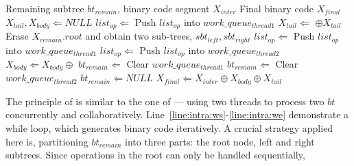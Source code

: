 \documentclass[12pt]{article}
\begin{document}
\begin{CJK}{UTF8}{bkai}
\begin{algorithm}[h]
    \caption{}
    \begin{algorithmic}[1]
        \Require    Remaining subtree $bt_{remain}$, binary code segment $X_{inter}$
        \Ensure     Final binary code $X_{final}$
        \State $X_{tail}, X_{body} \Leftarrow NULL$
            \label{line:intra:ws}
            \State $list_{op} \Leftarrow$ 
            \State Push $list_{op}$ into $work\_queue_{thread1}$
            \State $X_{tail} \Leftarrow$  $\oplus X_{tail}$
            \State Erase $X_{remain}.root$ and obtain two sub-trees, $sbt_{left}, sbt_{right}$
            \Statex
            \State $list_{op} \Leftarrow$ 
            \State Push $list_{op}$ into $work\_queue_{thread1}$
            \State $list_{op} \Leftarrow$ 
            \State Push $list_{op}$ into $work\_queue_{thread2}$
            \State $X_{body} \Leftarrow X_{body} \oplus$ 
            \Statex
                \State $bt_{remain} \Leftarrow$ 
                \State Clear $work\_queue_{thread1}$
                \State $bt_{remain} \Leftarrow$ 
                \State Clear $work\_queue_{thread2}$
            \Else
                \State $bt_{remain} \Leftarrow NULL$
            \EndIf
        \EndWhile   \label{line:intra:we}
        \State $X_{final} \Leftarrow X_{inter} \oplus X_{body} \oplus X_{tail}$
        \State {}
    \end{algorithmic}
    \label{alg:intra}
\end{algorithm}
        The principle of  is similar to the one of  ---
        using two threads to process two $bt$ concurrently and collaboratively.
        Line~\ref{line:intra:ws}-\ref{line:intra:we} demonstrate a while loop, 
        which generates binary code iteratively.
        A crucial strategy applied here is, partitioning $bt_{remain}$ into three parts:
        the root node, left and right subtrees.
        Since operations in the root can only be handled sequentially, 

\end{CJK}
\end{document}
